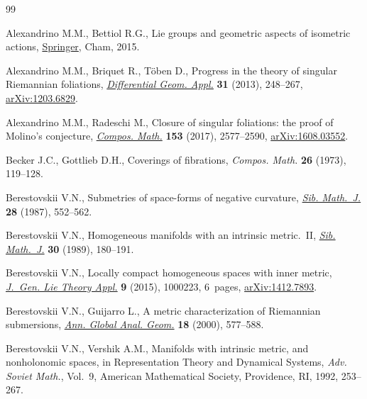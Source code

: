 \documentclass[10pt,a4paper]{amsart}
\numberwithin{equation}{section}
\theoremstyle{definition}
\begin{document}
\begin{thebibliography}{99}
\footnotesize\itemsep=0pt

Alexandrino M.M., Bettiol R.G., Lie groups and geometric aspects of isometric
 actions, \href{https://doi.org/10.1007/978-3-319-16613-1}{Springer}, Cham,
 2015.

Alexandrino M.M., Briquet R., T\"oben D., Progress in the theory of singular
 {R}iemannian foliations,
 \href{https://doi.org/10.1016/j.difgeo.2013.01.004}{\textit{Differential
 Geom. Appl.}} \textbf{31} (2013), 248--267,
 \href{http://arxiv.org/abs/1203.6829}{arXiv:1203.6829}.

Alexandrino M.M., Radeschi M., Closure of singular foliations: the proof of
 {M}olino's conjecture,
 \href{https://doi.org/10.1112/S0010437X17007485}{\textit{Compos. Math.}}
 \textbf{153} (2017), 2577--2590,
 \href{http://arxiv.org/abs/1608.03552}{arXiv:1608.03552}.

Becker J.C., Gottlieb D.H., Coverings of fibrations, \textit{Compos. Math.}
 \textbf{26} (1973), 119--128.

Berestovskii V.N., Submetries of space-forms of negative curvature,
 \href{https://doi.org/10.1007/BF00973842}{\textit{Sib. Math.~J.}} \textbf{28}
 (1987), 552--562.

Berestovskii V.N., Homogeneous manifolds with an intrinsic metric.~{II},
 \href{https://doi.org/10.1007/BF00971372}{\textit{Sib. Math.~J.}} \textbf{30}
 (1989), 180--191.

Berestovskii V.N., Locally compact homogeneous spaces with inner metric,
 \href{https://doi.org/10.4172/1736-4337.1000223}{\textit{J.~Gen. Lie Theory
 Appl.}} \textbf{9} (2015), 1000223, 6~pages,
 \href{http://arxiv.org/abs/1412.7893}{arXiv:1412.7893}.

Berestovskii V.N., Guijarro L., A metric characterization of {R}iemannian
 submersions, \href{https://doi.org/10.1023/A:1006683922481}{\textit{Ann.
 Global Anal. Geom.}} \textbf{18} (2000), 577--588.

Berestovskii V.N., Vershik A.M., Manifolds with intrinsic metric, and
 nonholonomic spaces, in Representation {T}heory and {D}ynamical {S}ystems,
 \textit{Adv. Soviet Math.}, Vol.~9, American Mathematical Society,
 Providence, RI, 1992, 253--267.


\end{thebibliography}
\end{document}

